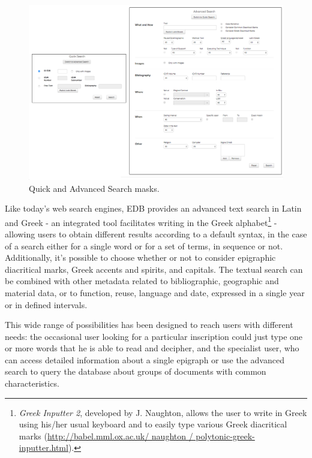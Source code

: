 \documentclass[amsthm,ebook]{saparticle}
\begin{document}
\begin{figure}[!hbp]
\centering
 \includegraphics[width=\columnwidth]{EAGLE2016Roccoengrev-img011.png}
\caption{Quick and Advanced Search masks.}
\label{fig:11}
\end{figure}
 


Like today's web search engines, EDB provides an advanced text search in Latin and Greek - an integrated tool
facilitates writing in the Greek alphabet\footnote{ \emph{Greek Inputter 2}, developed by J. Naughton, allows the user to
write in Greek using his/her usual keyboard and to easily type various Greek diacritical marks
(\url{http://babel.mml.ox.ac.uk/ naughton / polytonic-greek-inputter.html}).} - allowing users to obtain different results
according to a default syntax, in the case of a search either for a single word or for a set of terms, in sequence or
not. Additionally, it's possible to choose whether or not to consider epigraphic diacritical marks, Greek accents and
spirits, and capitals. The textual search can be combined with other metadata related to bibliographic, geographic and
material data, or to function, reuse, language and date, expressed in a single year or in defined intervals. 

This wide range of possibilities has been designed to reach users with different needs: the occasional user looking for
a particular inscription could just type one or more words that he is able to read and decipher, and the specialist
user, who can access detailed information about a single epigraph or use the advanced search to query the database
about groups of documents with common characteristics. 
\end{document}
